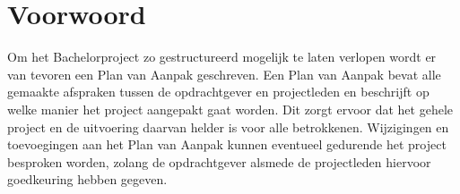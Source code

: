 \section*{Voorwoord}
Om het Bachelorproject zo gestructureerd mogelijk te laten verlopen wordt er van tevoren een Plan van Aanpak geschreven. Een Plan van Aanpak bevat alle gemaakte afspraken tussen de opdrachtgever en projectleden en beschrijft op welke manier het project aangepakt gaat worden. Dit zorgt ervoor dat het gehele project en de uitvoering daarvan helder is voor alle betrokkenen. Wijzigingen en toevoegingen aan het Plan van Aanpak kunnen eventueel gedurende het project besproken worden, zolang de opdrachtgever alsmede de projectleden hiervoor goedkeuring hebben gegeven.\\